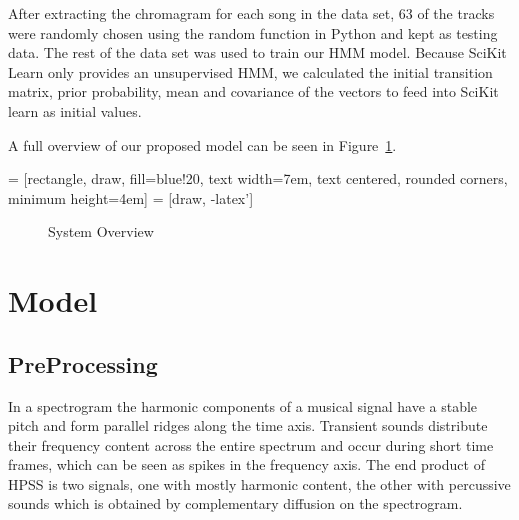 \documentclass{article}
\begin{document}
After extracting the chromagram for each song in the data set, 63 of the tracks
were randomly chosen using the random function in Python and kept as testing
data. The rest of the data set was used to train our HMM model. Because SciKit
Learn only provides an unsupervised HMM, we calculated the initial transition
matrix, prior probability, mean and covariance of the vectors to feed into
SciKit learn as initial values.

A full overview of our proposed model can be seen in Figure~\ref{fig:overview}.

 = [rectangle, draw, fill=blue!20,
    text width=7em, text centered, rounded corners, minimum height=4em]
 = [draw, -latex']

\begin{figure}
\caption{System Overview}
\label{fig:overview}
\end{figure}

\section{Model}

\subsection{PreProcessing}

In a spectrogram the harmonic components of a musical signal have a stable
pitch and form parallel ridges along the time axis. Transient sounds distribute
their frequency content across the entire spectrum and occur during short time
frames, which can be seen as spikes in the frequency axis. The end product of
HPSS is two signals, one with mostly harmonic content, the other with
percussive sounds which is obtained by complementary diffusion on the
spectrogram.
\end{document}
